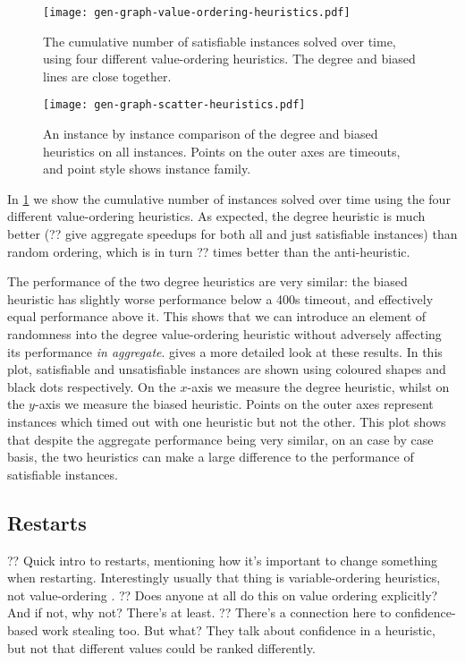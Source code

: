 \documentclass{article}
\newcommand{\citet}[1]{\citeauthor{#1} \shortcite{#1}}
\newcommand{\citep}[1]{\cite{#1}}
\begin{document}
\begin{figure}[p]
    \centering
    \texttt{[image: gen-graph-value-ordering-heuristics.pdf]}

    \caption{The cumulative number of satisfiable instances solved over time, using four
    different value-ordering heuristics. The degree and biased lines are close together.}
    \label{figure:value-ordering-heuristics}
\end{figure}

\begin{figure}[p]
    \centering
    \texttt{[image: gen-graph-scatter-heuristics.pdf]}

    \caption{An instance by instance comparison of the degree and biased heuristics on all
    instances. Points on the outer axes are timeouts, and point style shows instance family.}
    \label{figure:scatter-heuristics}
\end{figure}

In \cref{figure:value-ordering-heuristics} we show the cumulative number of instances solved over
time using the four different value-ordering heuristics. As expected, the degree heuristic is much
better (?? give aggregate speedups for both all and just satisfiable instances) than random
ordering, which is in turn ?? times better than the anti-heuristic.

The performance of the two degree heuristics are very similar: the
biased heuristic has slightly worse performance below a 400s timeout, and effectively equal
performance above it. This shows that we can introduce an element of randomness into the degree
value-ordering heuristic without adversely affecting its performance \emph{in aggregate}.
 gives a more detailed look at these results. In this plot,
satisfiable and unsatisfiable instances are shown using coloured shapes and black dots respectively.
On the $x$-axis we measure the degree heuristic, whilst on the $y$-axis we measure the biased
heuristic. Points on the outer axes represent instances which timed out with one heuristic but not
the other.  This plot shows that despite the aggregate performance being very similar, on an case by
case basis, the two heuristics can make a large difference to the performance of satisfiable
instances.

\subsection{Restarts}

?? Quick intro to restarts, mentioning how it's important to change something when restarting.
Interestingly usually that thing is variable-ordering heuristics, not value-ordering
\citep{DBLP:conf/ijcai/LecoutreSTV07,DBLP:journals/jsat/LecoutreSTV07,DBLP:conf/cp/GayHLS15,DBLP:conf/aaai/LeeSZ16,DBLP:conf/cp/GlorianBLLM17}.
?? Does anyone at all do this on value ordering explicitly? And if not, why not? There's
\citet{DBLP:conf/flairs/RazgonOP07} at least. ?? There's a connection here to confidence-based work
stealing \citep{DBLP:conf/cp/ChuSS09} too. But what? They talk about confidence in a heuristic, but
not that different values could be ranked differently.
\end{document}
